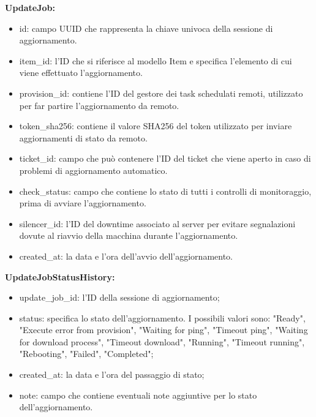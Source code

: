 \textbf{UpdateJob:}
\begin{itemize}
\item id: campo UUID che rappresenta la chiave univoca della sessione di aggiornamento.
\item item\_id: l'ID che si riferisce al modello Item e specifica l'elemento di cui viene effettuato l'aggiornamento.
\item provision\_id: contiene l'ID del gestore dei task schedulati remoti, utilizzato per far partire l'aggiornamento da remoto.
\item token\_sha256: contiene il valore SHA256 del token utilizzato per inviare aggiornamenti di stato da remoto.
\item ticket\_id: campo che può contenere l'ID del ticket che viene aperto in caso di problemi di aggiornamento automatico.
\item check\_status: campo che contiene lo stato di tutti i controlli di monitoraggio, prima di avviare l'aggiornamento.
\item silencer\_id: l'ID del downtime associato al server per evitare segnalazioni dovute al riavvio della macchina durante l'aggiornamento.
\item created\_at: la data e l'ora dell'avvio dell'aggiornamento.
\end{itemize}

\textbf{UpdateJobStatusHistory:}
\begin{itemize}
\item update\_job\_id:  l'ID della sessione di aggiornamento;
\item status: specifica lo stato dell'aggiornamento. I possibili valori sono: "Ready", "Execute error from provision", "Waiting for ping", "Timeout ping", "Waiting for download process", "Timeout download", "Running", "Timeout running", "Rebooting", "Failed", "Completed";
\item created\_at: la data e l'ora del passaggio di stato;
\item note: campo che contiene eventuali note aggiuntive per lo stato dell'aggiornamento.
\end{itemize}
